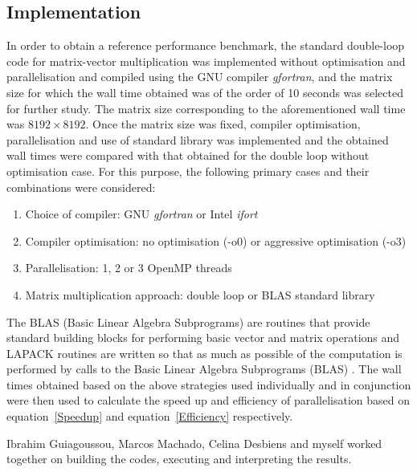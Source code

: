 \documentclass[11pt, oneside]{article}   	%
\begin{document}
\subsection{Implementation}
In order to obtain a reference performance benchmark, the standard double-loop code for matrix-vector multiplication was implemented without optimisation and parallelisation and compiled using the GNU compiler \textit{gfortran}, and the matrix size for which the wall time obtained was of the order of 10 seconds was selected for further study. The matrix size corresponding to the aforementioned wall time was \(8192\times8192\). Once the matrix size was fixed, compiler optimisation, parallelisation and use of standard library was implemented and the obtained wall times were compared with that obtained for the double loop without optimisation case. For this purpose, the following primary cases and their combinations were considered:
\begin{enumerate}
	\item{Choice of compiler: GNU \textit{gfortran} or Intel \textit{ifort}}
	\item{Compiler optimisation: no optimisation (-o0) or aggressive optimisation (-o3)}
	\item{Parallelisation: 1, 2 or 3 OpenMP threads}
	\item{Matrix multiplication approach: double loop or BLAS standard library}
\end{enumerate}

The BLAS (Basic Linear Algebra Subprograms) are routines that provide standard building blocks for performing basic vector and matrix operations \cite{Blackford:2002aa} and LAPACK routines are written so that as much as possible of the computation is performed by calls to the Basic Linear Algebra Subprograms (BLAS) \cite{Lawson:1979aa}. The wall times obtained based on the above strategies used individually and in conjunction were then used to calculate the speed up and efficiency of parallelisation based on equation~\ref{Speedup} and equation~\ref{Efficiency} respectively. 

Ibrahim Guiagoussou, Marcos Machado, Celina Desbiens and myself worked together on building the codes, executing and interpreting the results. 
	
\end{document}
